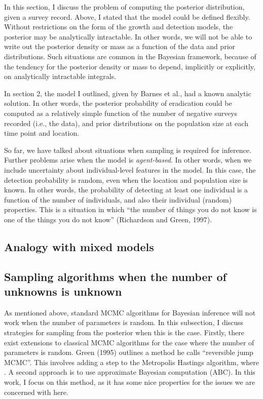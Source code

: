 \documentclass[
]{book}
\begin{document}
In this section, I discuss the problem of computing the posterior distribution, given a survey record. Above, I stated that the model could be defined flexibly. Without restrictions on the form of the growth and detection models, the posterior may be analytically intractable. In other words, we will not be able to write out the posterior density or mass as a function of the data and prior distributions. Such situations are common in the Bayesian framework, because of the tendency for the posterior density or mass to depend, implicitly or explicitly, on analytically intractable integrals.

In section 2, the model I outlined, given by Barnes et al., had a known analytic solution. In other words, the posterior probability of eradication could be computed as a relatively simple function of the number of negative surveys recorded (i.e., the data), and prior distributions on the population size at each time point and location.

So far, we have talked about situations when sampling is required for inference. Further problems arise when the model is \emph{agent-based}. In other words, when we include uncertainty about individual-level features in the model. In this case, the detection probability is random, even when the location and population size is known. In other words, the probability of detecting at least one individual is a function of the number of individuals, and also their individual (random) properties. This is a situation in which ``the number of things you do not know is one of the things you do not know'' (Richardson and Green, 1997).

\hypertarget{analogy-with-mixed-models}{%
\subsection{Analogy with mixed models}\label{analogy-with-mixed-models}}

\hypertarget{sampling-algorithms-when-the-number-of-unknowns-is-unknown}{%
\subsection{Sampling algorithms when the number of unknowns is unknown}\label{sampling-algorithms-when-the-number-of-unknowns-is-unknown}}

As mentioned above, standard MCMC algorithms for Bayesian inference will not work when the number of parameters is random. In this subsection, I discuss strategies for sampling from the posterior when this is the case. Firstly, there exist extensions to classical MCMC algorithms for the case where the number of parameters is random. Green (1995) outlines a method he calls ``reversible jump MCMC''. This involves adding a step to the Metropolis Hastings algorithm, where . A second approach is to use approximate Bayesian computation (ABC). In this work, I focus on this method, as it has some nice properties for the issues we are concerned with here.
\end{document}
